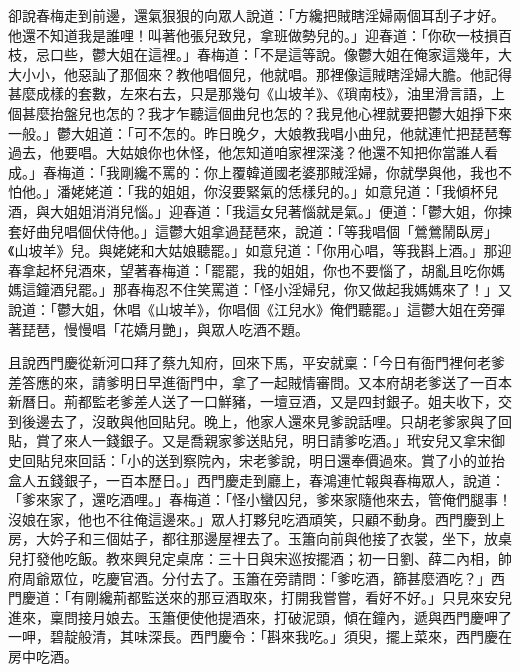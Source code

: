 卻說春梅走到前邊，還氣狠狠的向眾人說道：「方纔把賊瞎淫婦兩個耳刮子才好。他還不知道我是誰哩！叫著他張兒致兒，拿班做勢兒的。」迎春道：「你砍一枝損百枝，忌口些，鬱大姐在這裡。」春梅道：「不是這等說。像鬱大姐在俺家這幾年，大大小小，他惡訕了那個來？教他唱個兒，他就唱。那裡像這賊瞎淫婦大膽。他記得甚麼成樣的套數，左來右去，只是那幾句《山坡羊》、《瑣南枝》，油里滑言語，上個甚麼抬盤兒也怎的？我才乍聽這個曲兒也怎的？我見他心裡就要把鬱大姐掙下來一般。」鬱大姐道：「可不怎的。昨日晚夕，大娘教我唱小曲兒，他就連忙把琵琶奪過去，他要唱。大姑娘你也休怪，他怎知道咱家裡深淺？他還不知把你當誰人看成。」春梅道：「我剛纔不罵的：你上覆韓道國老婆那賊淫婦，你就學與他，我也不怕他。」潘姥姥道：「我的姐姐，你沒要緊氣的恁樣兒的。」如意兒道：「我傾杯兒酒，與大姐姐消消兒惱。」迎春道：「我這女兒著惱就是氣。」便道：「鬱大姐，你揀套好曲兒唱個伏侍他。」這鬱大姐拿過琵琶來，說道：「等我唱個「鶯鶯鬧臥房」《山坡羊》兒。與姥姥和大姑娘聽罷。」如意兒道：「你用心唱，等我斟上酒。」那迎春拿起杯兒酒來，望著春梅道：「罷罷，我的姐姐，你也不要惱了，胡亂且吃你媽媽這鐘酒兒罷。」那春梅忍不住笑罵道：「怪小淫婦兒，你又做起我媽媽來了！」又說道：「鬱大姐，休唱《山坡羊》，你唱個《江兒水》俺們聽罷。」這鬱大姐在旁彈著琵琶，慢慢唱「花嬌月艷」，與眾人吃酒不題。

且說西門慶從新河口拜了蔡九知府，回來下馬，平安就稟：「今日有衙門裡何老爹差答應的來，請爹明日早進衙門中，拿了一起賊情審問。又本府胡老爹送了一百本新曆日。荊都監老爹差人送了一口鮮豬，一壇豆酒，又是四封銀子。姐夫收下，交到後邊去了，沒敢與他回貼兒。晚上，他家人還來見爹說話哩。只胡老爹家與了回貼，賞了來人一錢銀子。又是喬親家爹送貼兒，明日請爹吃酒。」玳安兒又拿宋御史回貼兒來回話：「小的送到察院內，宋老爹說，明日還奉價過來。賞了小的並抬盒人五錢銀子，一百本歷日。」西門慶走到廳上，春鴻連忙報與春梅眾人，說道：「爹來家了，還吃酒哩。」春梅道：「怪小蠻囚兒，爹來家隨他來去，管俺們腿事！沒娘在家，他也不往俺這邊來。」眾人打夥兒吃酒頑笑，只顧不動身。西門慶到上房，大妗子和三個姑子，都往那邊屋裡去了。玉簫向前與他接了衣裳，坐下，放桌兒打發他吃飯。教來興兒定桌席：三十日與宋巡按擺酒；初一日劉、薛二內相，帥府周爺眾位，吃慶官酒。分付去了。玉簫在旁請問：「爹吃酒，篩甚麼酒吃？」西門慶道：「有剛纔荊都監送來的那豆酒取來，打開我嘗嘗，看好不好。」只見來安兒進來，稟問接月娘去。玉簫便使他提酒來，打破泥頭，傾在鐘內，遞與西門慶呷了一呷，碧靛般清，其味深長。西門慶令：「斟來我吃。」須臾，擺上菜來，西門慶在房中吃酒。

